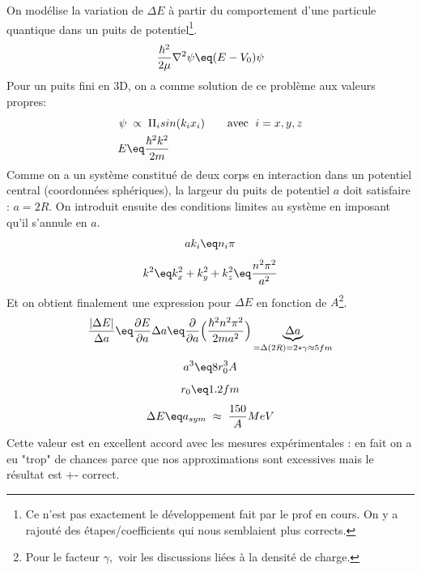 On modélise la variation de $\Delta E$ à partir du comportement d'une particule quantique dans un puits de potentiel\footnote{Ce n'est pas exactement le développement fait par le prof en cours. On y a rajouté des étapes/coefficients qui nous semblaient plus corrects.}.\\
\begin{equation*}
    \frac{\hbar^2}{2\mu}\nabla^2 \psi \eq (E- V_0)\psi
\end{equation*}
Pour un puits fini en 3D, on a comme solution de ce problème aux valeurs propres:
\begin{align*}
    \psi &\;\propto\; 
    \Pi_i sin(k_i x_i) \qquad \text{avec }\; i ={x,y,z}\\
    E &\eq \dfrac{\hbar^2 k^2}{2m}
\end{align*}
Comme on a un système constitué de deux corps en interaction dans un potentiel central (coordonnées sphériques), la largeur du puits de potentiel $a$ doit satisfaire : $a = 2R$. On introduit ensuite des conditions limites au système en imposant qu'il s'annule en $a$.
\begin{equation*}
    ak_i \eq n_i \pi
\end{equation*}
\begin{equation*}
    k^2 \eq k_x^2 + k_y^2 + k_z^2 \eq \frac{n^2\pi^2}{a^2}
\end{equation*}
Et on obtient finalement une expression pour $\Delta E$ en fonction de $A$\footnote{Pour le facteur $\gamma,$ voir les discussions liées à la densité de charge.}.
\begin{equation*}
    \frac{|\Delta E|}{\Delta a} 
    \eq \dfrac{\partial E}{\partial a}\Delta a
    \eq \dfrac{\partial}{\partial a}\Big( \frac{\hbar^2n^2\pi^2}{2ma^2}\Big)\underbrace{\Delta a}_{=\Delta(2R)= 2*\gamma\approx 5fm}
\end{equation*}
\begin{equation*}
    a^3 \eq 8r_0^3 A
\end{equation*}
\begin{equation*}
    r_0 \eq 1.2fm
\end{equation*}
\begin{equation*}
    \Delta E \eq a_{sym} \;\approx\; \frac{150}{A}MeV
\end{equation*}
Cette valeur est en excellent accord avec les mesures expérimentales : en fait on a eu "trop" de chances parce que nos approximations sont excessives mais le résultat est +- correct.





